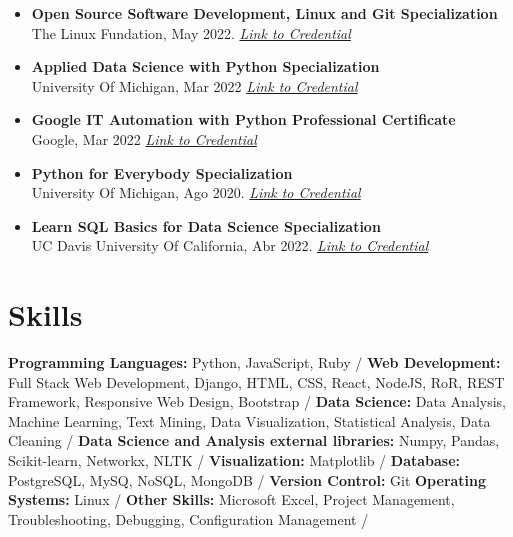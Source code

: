 \documentclass[a4paper,10pt]{article}
\begin{document}
\begin{itemize}[left=0pt]
		\item \textbf{Open Source Software Development, Linux and Git Specialization} \\
		The Linux Fundation, May 2022.
		\textit{\href{https://portfolio-mparraf.herokuapp.com/static/shared/Open Source Software Development, Linux and Git.pdf}{Link to Credential}}
		
		\item \textbf{Applied Data Science with Python Specialization} \\
		University Of Michigan, Mar 2022
		\textit{\href{https://portfolio-mparraf.herokuapp.com/static/shared/Applied Data Science with Python.pdf}{Link to Credential}}
		
		\item \textbf{Google IT Automation with Python Professional Certificate} \\
		Google, Mar 2022
		\textit{\href{https://portfolio-mparraf.herokuapp.com/static/shared/Google IT  Automation with Python.pdf}{Link to Credential}}
		
		\item \textbf{Python for Everybody Specialization} \\
		University Of Michigan, Ago 2020. \textit{\href{https://portfolio-mparraf.herokuapp.com/static/shared/PythonforEverybodySpecialization.pdf}{Link to Credential}}
		
		
		\item \textbf{Learn SQL Basics for Data Science Specialization} \\
		UC Davis University Of California, Abr 2022.
		\textit{\href{https://portfolio-mparraf.herokuapp.com/static/shared/Learn SQL Basics for Data Science Specialization.pdf}{Link to Credential}}
		
		
	\end{itemize}
	
	
	\section*{Skills}
	\textbf{Programming Languages:} Python, JavaScript, Ruby /
	\textbf{Web Development:} Full Stack Web Development, Django, HTML, CSS, React, NodeJS, RoR, REST Framework, Responsive Web Design, Bootstrap /
	\textbf{Data Science:} Data Analysis, Machine Learning, Text Mining, Data Visualization, Statistical Analysis, Data Cleaning /
	\textbf{Data Science and Analysis external libraries:} Numpy, Pandas, Scikit-learn, Networkx, NLTK /
	\textbf{Visualization:} Matplotlib /
	\textbf{Database:} PostgreSQL, MySQ, NoSQL, MongoDB  /
	\textbf{Version Control:} Git  \textbf{Operating Systems:} Linux  /
	\textbf{Other Skills:} Microsoft Excel, Project Management, Troubleshooting, Debugging, Configuration Management /
	
\end{document}
